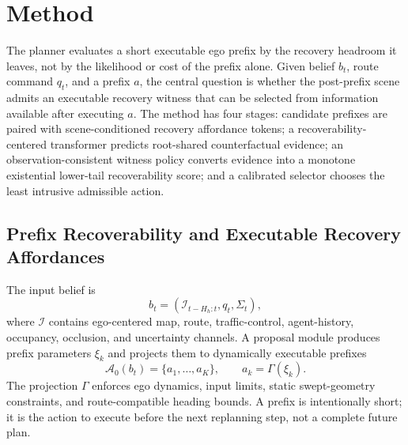 \documentclass[conference]{IEEEtran}
\begin{document}

\section{Method}
\label{sec:method}

The planner evaluates a short executable ego prefix by the recovery headroom it leaves, not by the likelihood or cost of the prefix alone.  Given belief $b_t$, route command $q_t$, and a prefix $a$, the central question is whether the post-prefix scene admits an executable recovery witness that can be selected from information available after executing $a$.  The method has four stages: candidate prefixes are paired with scene-conditioned recovery affordance tokens; a recoverability-centered transformer predicts root-shared counterfactual evidence; an observation-consistent witness policy converts evidence into a monotone existential lower-tail recoverability score; and a calibrated selector chooses the least intrusive admissible action.

\subsection{Prefix Recoverability and Executable Recovery Affordances}
\label{subsec:prefix_affordances}

The input belief is
\begin{equation}
\label{eq:method_belief_new}
    b_t=(\mathcal I_{t-H_h:t}, q_t, \Sigma_t),
\end{equation}
where $\mathcal I$ contains ego-centered map, route, traffic-control, agent-history, occupancy, occlusion, and uncertainty channels.  A proposal module produces prefix parameters $\xi_k$ and projects them to dynamically executable prefixes
\begin{equation}
\label{eq:method_action_set_new}
    \mathcal A_0(b_t)=\{a_1,\ldots,a_K\},\qquad a_k=\Gamma(\xi_k).
\end{equation}
The projection $\Gamma$ enforces ego dynamics, input limits, static swept-geometry constraints, and route-compatible heading bounds.  A prefix is intentionally short; it is the action to execute before the next replanning step, not a complete future plan.
\end{document}
